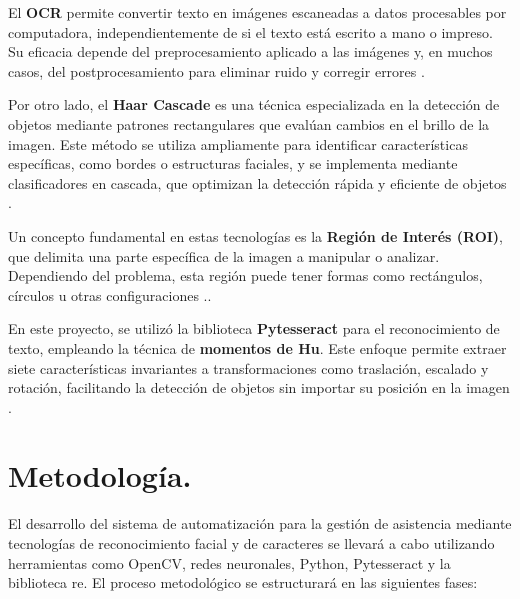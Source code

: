 \documentclass[12pt, letterpaper]{article}
\begin{document}
El \textbf{OCR} permite convertir texto en imágenes escaneadas a datos procesables por computadora, independientemente de si el texto está escrito a mano o impreso. Su eficacia depende del preprocesamiento aplicado a las imágenes y, en muchos casos, del postprocesamiento para eliminar ruido y corregir errores \cite{b9}.

Por otro lado, el \textbf{Haar Cascade} es una técnica especializada en la detección de objetos mediante patrones rectangulares que evalúan cambios en el brillo de la imagen. Este método se utiliza ampliamente para identificar características específicas, como bordes o estructuras faciales, y se implementa mediante clasificadores en cascada, que optimizan la detección rápida y eficiente de objetos \cite{b10}.

Un concepto fundamental en estas tecnologías es la \textbf{Región de Interés (ROI)}, que delimita una parte específica de la imagen a manipular o analizar. Dependiendo del problema, esta región puede tener formas como rectángulos, círculos u otras configuraciones \cite{b11}..

En este proyecto, se utilizó la biblioteca \textbf{Pytesseract} para el reconocimiento de texto, empleando la técnica de \textbf{momentos de Hu}. Este enfoque permite extraer siete características invariantes a transformaciones como traslación, escalado y rotación, facilitando la detección de objetos sin importar su posición en la imagen \cite{b14}.

 


\FloatBarrier


\section{Metodología.}
El desarrollo del sistema de automatización para la gestión de asistencia mediante tecnologías de reconocimiento facial y de caracteres se llevará a cabo utilizando herramientas como OpenCV, redes neuronales, Python, Pytesseract y la biblioteca re. El proceso metodológico se estructurará en las siguientes fases:
\end{document}
